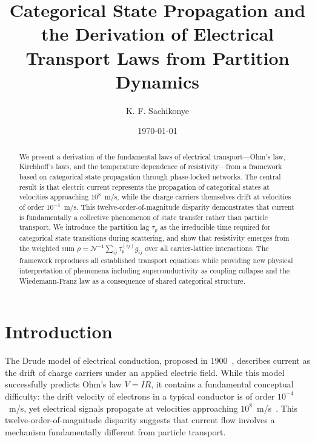 \documentclass[twocolumn,showpacs,preprintnumbers,amsmath,amssymb,prd]{revtex4-2}
\newcommand{\taup}{\tau_p}
\begin{document}
\title{Categorical State Propagation and the Derivation of Electrical Transport Laws from Partition Dynamics}

\author{K. F. Sachikonye}

\date{\today}

\begin{abstract}
We present a derivation of the fundamental laws of electrical transport---Ohm's law, Kirchhoff's laws, and the temperature dependence of resistivity---from a framework based on categorical state propagation through phase-locked networks. The central result is that electric current represents the propagation of categorical states at velocities approaching $10^8$~m/s, while the charge carriers themselves drift at velocities of order $10^{-4}$~m/s. This twelve-order-of-magnitude disparity demonstrates that current is fundamentally a collective phenomenon of state transfer rather than particle transport. We introduce the partition lag $\taup$ as the irreducible time required for categorical state transitions during scattering, and show that resistivity emerges from the weighted sum $\rho = \mathcal{N}^{-1}\sum_{ij}\taup^{(ij)}g_{ij}$ over all carrier-lattice interactions. The framework reproduces all established transport equations while providing new physical interpretation of phenomena including superconductivity as coupling collapse and the Wiedemann-Franz law as a consequence of shared categorical structure.
\end{abstract}


\maketitle

\section{Introduction}
\label{sec:introduction}

The Drude model of electrical conduction, proposed in 1900~\cite{Drude1900}, describes current as the drift of charge carriers under an applied electric field. While this model successfully predicts Ohm's law $V = IR$, it contains a fundamental conceptual difficulty: the drift velocity of electrons in a typical conductor is of order $10^{-4}$~m/s, yet electrical signals propagate at velocities approaching $10^8$~m/s~\cite{Griffiths2017}. This twelve-order-of-magnitude disparity suggests that current flow involves a mechanism fundamentally different from particle transport.
\end{document}

